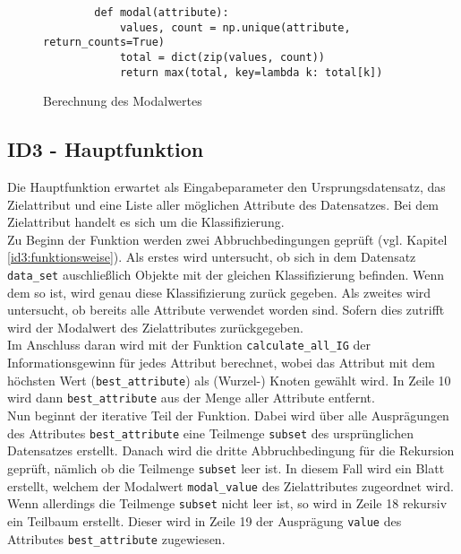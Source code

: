 \begin{figure}[H]
    \centering
    \begin{verbatim}
        def modal(attribute):
            values, count = np.unique(attribute, return_counts=True)
            total = dict(zip(values, count))
            return max(total, key=lambda k: total[k])
    \end{verbatim}
    \caption{Berechnung des Modalwertes \autocite{MaxKeyByValue:online}}
\end{figure}

\subsection{ID3 - Hauptfunktion}
\label{id3:implementation-id3}
Die Hauptfunktion erwartet als Eingabeparameter den Ursprungsdatensatz, das Zielattribut und eine Liste aller möglichen Attribute des Datensatzes. Bei dem Zielattribut handelt es sich um die Klassifizierung.\\
Zu Beginn der Funktion werden zwei Abbruchbedingungen geprüft (vgl. Kapitel \ref{id3:funktionsweise}). Als erstes wird untersucht, ob sich in dem Datensatz \texttt{data_set} auschließlich Objekte mit der gleichen Klassifizierung befinden. Wenn dem so ist, wird genau diese Klassifizierung zurück gegeben. Als zweites wird untersucht, ob bereits alle Attribute verwendet worden sind. Sofern dies zutrifft wird der Modalwert des Zielattributes zurückgegeben.\\
Im Anschluss daran wird mit der Funktion \texttt{calculate_all_IG} der Informationsgewinn für jedes Attribut berechnet, wobei das Attribut mit dem höchsten Wert (\texttt{best_attribute}) als (Wurzel-) Knoten gewählt wird. In Zeile 10 wird dann \texttt{best_attribute} aus der Menge aller Attribute entfernt.\\
Nun beginnt der iterative Teil der Funktion. Dabei wird über alle Ausprägungen des Attributes \texttt{best_attribute} eine Teilmenge \texttt{subset} des ursprünglichen Datensatzes erstellt. Danach wird die dritte Abbruchbedingung für die Rekursion geprüft, nämlich ob die Teilmenge \texttt{subset} leer ist. In diesem Fall wird ein Blatt erstellt, welchem der Modalwert \texttt{modal_value} des Zielattributes zugeordnet wird. Wenn allerdings die Teilmenge \texttt{subset} nicht leer ist, so wird in Zeile 18 rekursiv ein Teilbaum erstellt. Dieser wird in Zeile 19 der Ausprägung \texttt{value} des Attributes \texttt{best_attribute} zugewiesen.

